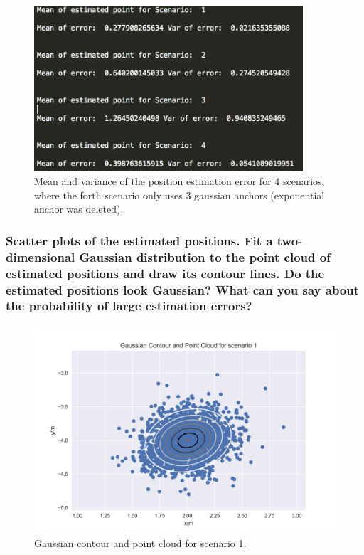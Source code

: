 \begin{figure}[H]
	\centering
\includegraphics[width=10cm]{mean_var_calc.png}
	\caption{Mean and variance of the position estimation error for 4 scenarios, where the forth scenario only uses 3 gaussian anchors (exponential anchor was deleted).}
	\label{fig1:meanvariance}
\end{figure}

\subsubsection{Scatter plots of the estimated positions. Fit a two-dimensional Gaussian distribution to the point cloud of estimated positions and draw its contour lines. Do the estimated positions look Gaussian? What can you say about the probability of large estimation errors?}

\begin{figure}[H]
	\centering
\includegraphics[width=14cm]{gauss1.png}
	\caption{Gaussian contour and point cloud for scenario 1.}
	\label{fig1:gpc1}
\end{figure}

